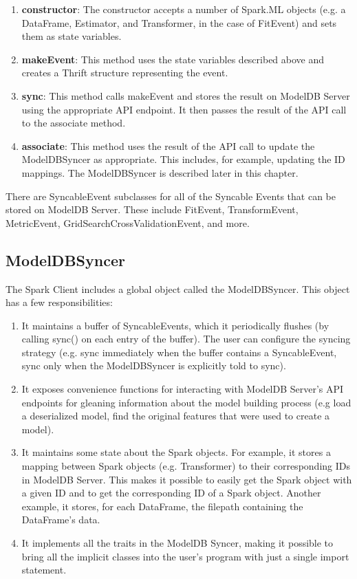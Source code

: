 \begin{enumerate}
  \item \textbf{constructor}: The constructor accepts a number of Spark.ML objects (e.g.
  a DataFrame, Estimator, and Transformer, in the case of FitEvent) and sets them as state variables.
  \item \textbf{makeEvent}: This method uses the state variables described above and
  creates a Thrift structure representing the event.
  \item \textbf{sync}: This method calls makeEvent and stores the result on ModelDB Server
  using the appropriate API endpoint. It then passes the result of the API call to the
  associate method.
  \item \textbf{associate}: This method uses the result of the API call to update the
  ModelDBSyncer as appropriate. This includes, for example, updating the ID mappings. The
  ModelDBSyncer is described later in this chapter.
\end{enumerate}

There are SyncableEvent subclasses for all of the Syncable Events that can be stored
on ModelDB Server. These include FitEvent, TransformEvent, MetricEvent, GridSearchCrossValidationEvent,
and more.

\subsection{ModelDBSyncer}
The Spark Client includes a global object called the ModelDBSyncer. This object has a few responsibilities:

\begin{enumerate}
  \item It maintains a buffer of SyncableEvents, which it periodically flushes (by calling sync() on each
  entry of the buffer). The user can configure the syncing strategy (e.g. sync immediately when the buffer contains
  a SyncableEvent, sync only when the ModelDBSyncer is explicitly told to sync).
  \item It exposes convenience functions for interacting with ModelDB Server's API endpoints
  for gleaning information about the model building process (e.g load a deserialized model,
  find the original features that were used to create a model).
  \item It maintains some state about the Spark objects. For example, it stores a mapping between
  Spark objects (e.g. Transformer) to their corresponding IDs in ModelDB Server. This makes it possible to easily get
  the Spark object with a given ID and to get the corresponding ID of a Spark object. Another example, it stores, for
  each DataFrame, the filepath containing the DataFrame's data.
  \item It implements all the traits in the ModelDB Syncer, making it possible to bring all the implicit classes
  into the user's program with just a single import statement.
\end{enumerate}

